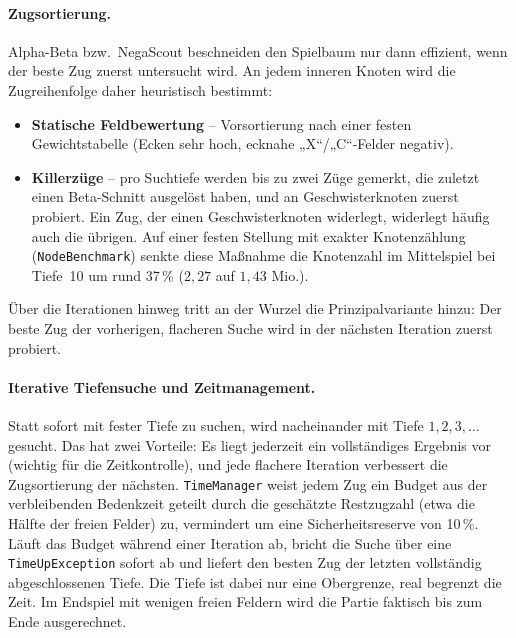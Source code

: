 \documentclass[11pt,a4paper, top=1cm]{article}
\begin{document}
\paragraph{Zugsortierung.}
Alpha-Beta bzw.\ NegaScout beschneiden den Spielbaum nur dann effizient, wenn der beste Zug
zuerst untersucht wird.
An jedem inneren Knoten wird die Zugreihenfolge daher heuristisch bestimmt:
\begin{itemize}
\item \textbf{Statische Feldbewertung} -- Vorsortierung nach einer festen Gewichtstabelle
(Ecken sehr hoch, ecknahe „X“/„C“-Felder negativ).
\item \textbf{Killerzüge} -- pro Suchtiefe werden bis zu zwei Züge gemerkt, die
zuletzt einen Beta-Schnitt ausgelöst haben, und an Geschwisterknoten zuerst probiert.
Ein Zug, der einen Geschwisterknoten widerlegt, widerlegt häufig auch die übrigen.
Auf einer festen Stellung mit exakter Knotenzählung (\texttt{NodeBenchmark}) senkte diese
Maßnahme die Knotenzahl im Mittelspiel bei Tiefe~10 um
rund 37\,\% ($2{,}27$ auf $1{,}43$ Mio.).
\end{itemize}
Über die Iterationen hinweg tritt an der Wurzel die Prinzipalvariante hinzu: Der
beste Zug der vorherigen, flacheren Suche wird in der nächsten Iteration zuerst probiert.

\paragraph{Iterative Tiefensuche und Zeitmanagement.}
Statt sofort mit fester Tiefe zu suchen, wird nacheinander mit Tiefe $1,2,3,\dots$ gesucht.
Das hat zwei Vorteile: Es liegt jederzeit ein vollständiges Ergebnis vor (wichtig für die
Zeitkontrolle), und jede flachere Iteration verbessert die Zugsortierung der nächsten.
\texttt{TimeManager} weist jedem Zug ein Budget aus der verbleibenden Bedenkzeit geteilt
durch die geschätzte Restzugzahl (etwa die Hälfte der freien Felder) zu, vermindert um eine
Sicherheitsreserve von 10\,\%. Läuft das Budget während einer Iteration ab, bricht die Suche
über eine \texttt{TimeUpException} sofort ab und liefert den besten Zug der letzten
vollständig abgeschlossenen Tiefe. Die Tiefe ist dabei nur eine Obergrenze, real begrenzt die
Zeit. Im Endspiel mit wenigen freien Feldern wird die Partie faktisch bis zum Ende
ausgerechnet.
\end{document}
